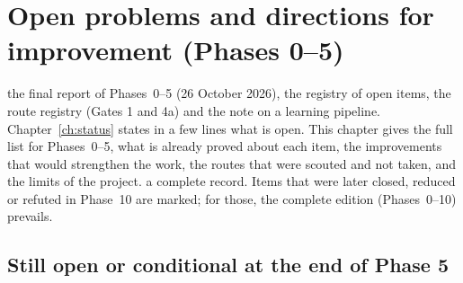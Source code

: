 \chapter{Open problems and directions for improvement (Phases 0--5)}\label{ch:openimprove}
\chapterbrief
{the final report of Phases~0--5 (26 October 2026), the registry of open items, the route registry (Gates 1 and 4a) and the note on a learning pipeline.}
{Chapter~\ref{ch:status} states in a few lines what is open. This chapter gives the full list for Phases~0--5, what is already proved about each item, the improvements that would strengthen the work, the routes that were scouted and not taken, and the limits of the project.}
{a complete record. Items that were later closed, reduced or refuted in Phase~10 are marked; for those, the complete edition (Phases~0--10) prevails.}

\section{Still open or conditional at the end of Phase 5}

